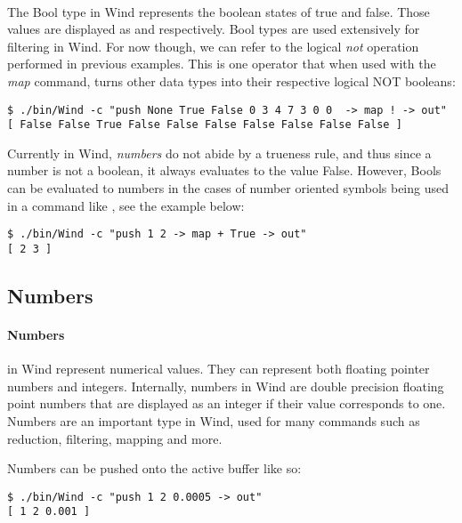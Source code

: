 \paragraph{  } The Bool type in Wind represents the boolean states of true and false. Those values are displayed as  and  respectively. Bool types are used extensively for filtering in Wind. For now though, we can refer to the logical \emph{not} operation performed in previous examples. This is one operator that when used with the \emph{map} command, turns other data types into their respective logical NOT booleans:

\begin{verbatim}
$ ./bin/Wind -c "push None True False 0 3 4 7 3 0 0  -> map ! -> out"
[ False False True False False False False False False False ]
\end{verbatim}

Currently in Wind, \emph{numbers} do not abide by a trueness rule, and thus since a number is not a boolean, it always evaluates to the value False. However, Bools can be evaluated to numbers in the cases of number oriented symbols being used in a command like , see the example below:

\begin{verbatim}
$ ./bin/Wind -c "push 1 2 -> map + True -> out"
[ 2 3 ]
\end{verbatim}

\subsection{Numbers}

\paragraph{Numbers} in Wind represent numerical values. They can represent both floating pointer numbers and integers. Internally, numbers in Wind are double precision floating point numbers that are displayed as an integer if their value corresponds to one. Numbers are an important type in Wind, used for many commands such as reduction, filtering, mapping and more.
\par Numbers can be pushed onto the active buffer like so:

\begin{verbatim}
$ ./bin/Wind -c "push 1 2 0.0005 -> out"
[ 1 2 0.001 ]
\end{verbatim}

